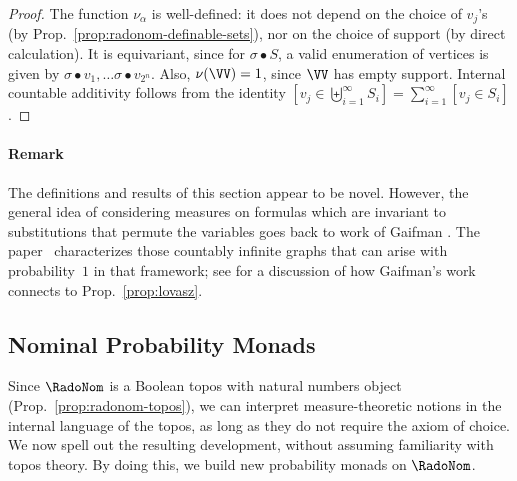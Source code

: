 \begin{proof}
The function $\nu_α$ is well-defined: it does not depend on the choice of $v_j$'s (by Prop.~\ref{prop:radonom-definable-sets}), nor on the choice of support (by direct calculation).
It is equivariant, since for $\sigma \bullet S$, a valid enumeration of vertices is given by $\sigma \bullet v_1, \dots \sigma \bullet v_{2^{n}}$. Also, $\nu(\VV) = 1$, since $\VV$ has empty support. Internal countable additivity follows from the identity $
\left[v_j \in \biguplus_{i=1}^\infty S_i\right] = \sum_{i=1}^{\infty}[v_j \in S_i]
$.
\end{proof}

    \paragraph*{Remark}
The definitions and results of this section appear to be novel. 
    However, the general idea of considering measures on formulas which are invariant to substitutions that permute the variables
goes back to work of Gaifman \cite{MR175755}.
The paper~\cite{MR3515800}
characterizes those countably infinite graphs that can arise with probability~$1$ in that framework;
see \cite{properly-ergodic}
for a discussion of how Gaifman's work connects to
Prop.~\ref{prop:lovasz}.

\subsection{Nominal Probability Monads}
\label{sec:nom-monad}
Since $\RadoNom$ is a Boolean topos with natural numbers object
(Prop.~\ref{prop:radonom-topos}), we can interpret measure-theoretic
notions in the internal language of the topos, as long as they do not
require the axiom of choice. We now spell out the resulting development, without assuming familiarity with topos theory. By doing this, we build new probability
monads on $\RadoNom$. %

